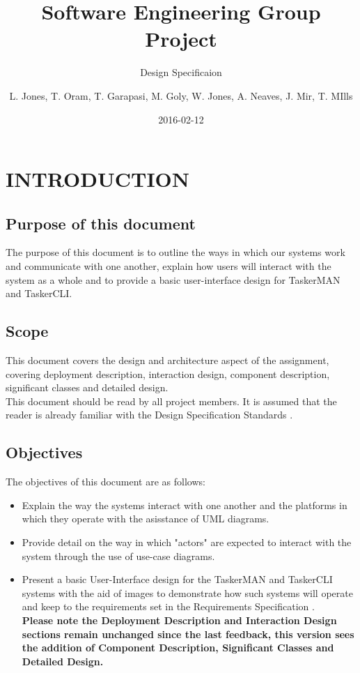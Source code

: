\documentclass{project}
\begin{document}
\title{Software Engineering Group Project}
\subtitle{Design Specificaion}
\author{L. Jones, T. Oram, T. Garapasi, M. Goly, W. Jones, A. Neaves, J. Mir, T. MIlls}     
\date{2016-02-12}
\maketitle
\tableofcontents
\newpage
\section{INTRODUCTION}
\subsection{Purpose of this document}
The purpose of this document is to outline the ways in which our systems work and communicate with one another, explain how users will interact with the system as a whole and to provide a basic user-interface design for TaskerMAN and TaskerCLI.
\subsection{Scope}
This document covers the design and architecture aspect of the assignment, covering deployment description, interaction design, component description, significant classes and detailed design. \\
\newline
This document should be read by all project members. It is assumed that the reader is already familiar with the Design Specification Standards \cite{se.qa.ds}.
\subsection{Objectives}
The objectives of this document are as follows:
\begin{itemize}
	\item Explain the way the systems interact with one another and the platforms in which they operate with the asisstance of UML diagrams.
	\item Provide detail on the way in which "actors" are expected to interact with the system through the use of use-case diagrams.
	\item Present a basic User-Interface design for the TaskerMAN and TaskerCLI systems with the aid of images to demonstrate how such systems will operate and keep to the requirements set in the Requirements Specification \cite{se.qa.rs}. \\
	
\textbf{Please note the Deployment Description and Interaction Design sections remain unchanged since the last feedback, this version sees the addition of Component Description, Significant Classes and Detailed Design.}	
\end{itemize} 
\clearpage
\end{document}
